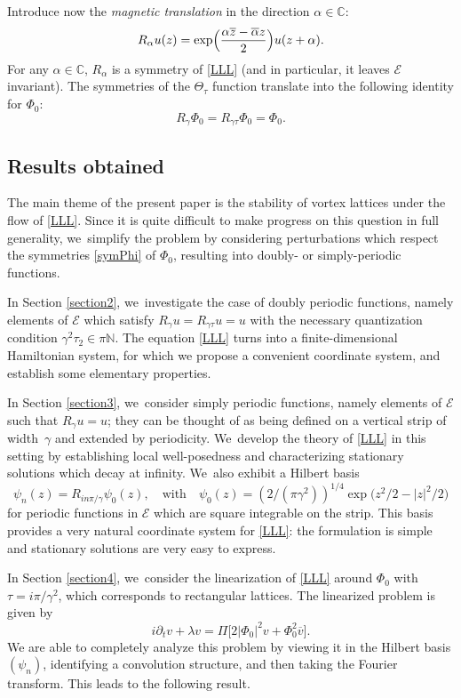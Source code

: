 \documentclass[JEP,XML,SOM,Unicode,NoFloatCountersInSection,published]{cedram}
\theoremstyle{definition}
\let\EE\exp
\let\ov\overline
\newcommand\C{\mathbb C}
\begin{document}
Introduce now the \textit{magnetic translation} in the direction $\alpha \in \mathbb{C}$:
\[
R_\alpha u (z) = \EE\Bigl(\frac{\alpha \ov{z} - \ov{\alpha} z}2\Bigr) u(z+\alpha).
\]
For any $\alpha\in \C$, $R_\alpha$ is a symmetry of \eqref{LLL} (and in particular, it leaves $\mathcal{E}$ invariant). The symmetries of the $\Theta_{\tau}$ function translate into the following identity for $\Phi_0$:
\begin{equation}
\label{symPhi}
R_{\gamma} \Phi_0 = R_{\gamma \tau} \Phi_0 = \Phi_0.
\end{equation}

\subsection{Results obtained}
The main theme of the present paper is the stability of vortex lattices under the flow of \eqref{LLL}. Since it is quite difficult to make progress on this question in full generality, we~simplify the problem by considering perturbations which respect the symmetries \eqref{symPhi} of $\Phi_0$, resulting into doubly- or simply-periodic functions.

In Section \ref{section2}, we~investigate the case of doubly periodic functions, namely elements of $\mathcal{E}$ which satisfy $R_\gamma u = R_{\gamma \tau} u = u$ with the necessary quantization condition $\gamma^2 \tau_2 \in \pi \mathbb{N}$. The equation \eqref{LLL} turns into a finite-dimensional Hamiltonian system, for which we propose a convenient coordinate system, and establish some elementary properties.

In Section \ref{section3}, we~consider simply periodic functions, namely elements of $\mathcal{E}$ such that $R_\gamma u = u$; they can be thought of as being defined on a vertical strip of width~$\gamma$ and extended by periodicity. We~develop the theory of \eqref{LLL} in this setting by establishing local well-posedness and characterizing stationary solutions which decay at infinity. We~also exhibit a Hilbert basis
\[
\psi_n(z) = R_{{in\pi}/{\gamma}} \psi_0 (z), \quad \text{with} \quad \psi_0(z) = \left({2}/({\pi \gamma^2}) \right)^{1/4} \EE\bigl(z^2/2 - |z|^2/2 \bigr)
\]
for periodic functions in $\mathcal{E}$ which are square integrable on the strip. This basis provides a very natural coordinate system for \eqref{LLL}: the formulation is simple and stationary solutions are very easy to express.

In Section \ref{section4}, we~consider the linearization of \eqref{LLL} around $\Phi_0$ with $\tau = {i \pi}/{\gamma^2}$, which corresponds to rectangular lattices. The linearized problem is given by
\begin{equation}
\label{linearizedpb}
i \partial_t v + \lambda v = \Pi \big[2 |\Phi_0|^2 v + \Phi_0^2 \overline{v}\big].
\end{equation}
We are able to completely analyze this problem by viewing it in the Hilbert basis $(\psi_n)$, identifying a convolution structure, and then taking the Fourier transform. This leads to the following result.
\end{document}

